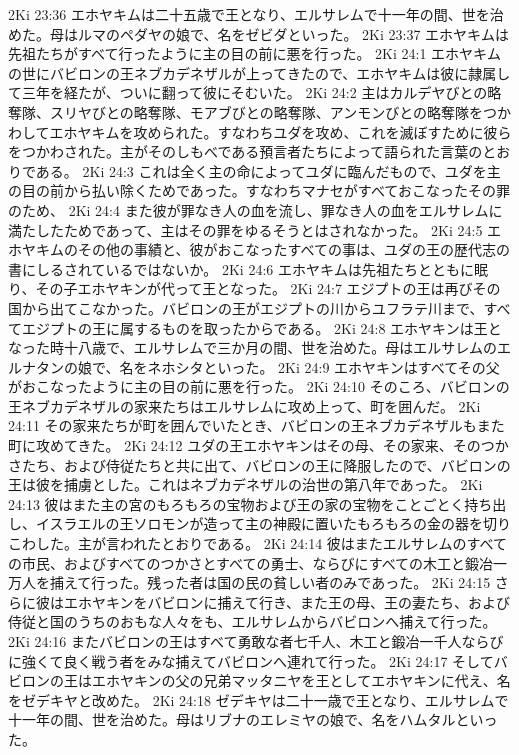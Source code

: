2Ki 23:36  エホヤキムは二十五歳で王となり、エルサレムで十一年の間、世を治めた。母はルマのペダヤの娘で、名をゼビダといった。
2Ki 23:37  エホヤキムは先祖たちがすべて行ったように主の目の前に悪を行った。
2Ki 24:1  エホヤキムの世にバビロンの王ネブカデネザルが上ってきたので、エホヤキムは彼に隷属して三年を経たが、ついに翻って彼にそむいた。
2Ki 24:2  主はカルデヤびとの略奪隊、スリヤびとの略奪隊、モアブびとの略奪隊、アンモンびとの略奪隊をつかわしてエホヤキムを攻められた。すなわちユダを攻め、これを滅ぼすために彼らをつかわされた。主がそのしもべである預言者たちによって語られた言葉のとおりである。
2Ki 24:3  これは全く主の命によってユダに臨んだもので、ユダを主の目の前から払い除くためであった。すなわちマナセがすべておこなったその罪のため、
2Ki 24:4  また彼が罪なき人の血を流し、罪なき人の血をエルサレムに満たしたためであって、主はその罪をゆるそうとはされなかった。
2Ki 24:5  エホヤキムのその他の事績と、彼がおこなったすべての事は、ユダの王の歴代志の書にしるされているではないか。
2Ki 24:6  エホヤキムは先祖たちとともに眠り、その子エホヤキンが代って王となった。
2Ki 24:7  エジプトの王は再びその国から出てこなかった。バビロンの王がエジプトの川からユフラテ川まで、すべてエジプトの王に属するものを取ったからである。
2Ki 24:8  エホヤキンは王となった時十八歳で、エルサレムで三か月の間、世を治めた。母はエルサレムのエルナタンの娘で、名をネホシタといった。
2Ki 24:9  エホヤキンはすべてその父がおこなったように主の目の前に悪を行った。
2Ki 24:10  そのころ、バビロンの王ネブカデネザルの家来たちはエルサレムに攻め上って、町を囲んだ。
2Ki 24:11  その家来たちが町を囲んでいたとき、バビロンの王ネブカデネザルもまた町に攻めてきた。
2Ki 24:12  ユダの王エホヤキンはその母、その家来、そのつかさたち、および侍従たちと共に出て、バビロンの王に降服したので、バビロンの王は彼を捕虜とした。これはネブカデネザルの治世の第八年であった。
2Ki 24:13  彼はまた主の宮のもろもろの宝物および王の家の宝物をことごとく持ち出し、イスラエルの王ソロモンが造って主の神殿に置いたもろもろの金の器を切りこわした。主が言われたとおりである。
2Ki 24:14  彼はまたエルサレムのすべての市民、およびすべてのつかさとすべての勇士、ならびにすべての木工と鍛冶一万人を捕えて行った。残った者は国の民の貧しい者のみであった。
2Ki 24:15  さらに彼はエホヤキンをバビロンに捕えて行き、また王の母、王の妻たち、および侍従と国のうちのおもな人々をも、エルサレムからバビロンへ捕えて行った。
2Ki 24:16  またバビロンの王はすべて勇敢な者七千人、木工と鍛冶一千人ならびに強くて良く戦う者をみな捕えてバビロンへ連れて行った。
2Ki 24:17  そしてバビロンの王はエホヤキンの父の兄弟マッタニヤを王としてエホヤキンに代え、名をゼデキヤと改めた。
2Ki 24:18  ゼデキヤは二十一歳で王となり、エルサレムで十一年の間、世を治めた。母はリブナのエレミヤの娘で、名をハムタルといった。
